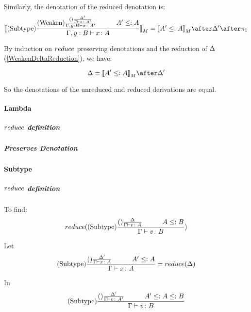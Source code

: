 {            Similarly, the denotation of the reduced denotation is:
            \begin{equation}
                \deno{\treerule{Subtype}{
                    \treerule{Weaken}{
                        \treerule{}{\D'}{\gtyperelation{x}{A'}}
                    } {
                        \typerelation{\gby}{x}{A'}
                    }
                    \s\s
                    A' \subtype A
                    }{\typerelation{\gby}{x}{A}}} = \deno{A'\subtype A}\after \D' \after \p
            \end{equation}


            By induction on $reduce$ preserving denotations and the reduction of $\Delta$ (\ref{WeakenDeltaReduction}), we have:

            \begin{equation}
                \D = \deno{A' \subtype A}\after\D'
            \end{equation}

            So the denotations of the unreduced and reduced derivations are equal.

            \paragraph{Lambda}
            \subparagraph{$reduce$ definition}
            \subparagraph{Preserves Denotation}

            \paragraph{Subtype}
            \subparagraph{$reduce$ definition}
            To find:
            \begin{equation}
                \reduce(\treerule{Subtype}{\treerule{}{\D}{\gtyperelation{v}{A}}\s\s A \subtype B}{\gtyperelation{v}{B}})
            \end{equation}

            Let 
            \begin{equation}\label{SubtypeDeltaReduction}
                \treerule{Subtype}{\treerule{}{\D'}{\gtyperelation{x}{A}}\s\s A'\subtype A}{\gtyperelation{x}{A}} = \reduce(\D)
            \end{equation}

            In 
            \begin{equation}
                \treerule{Subtype}{
                    \treerule{}{\D'}{\gtyperelation{v}{A'}}
                \s\s
                A' \subtype A \subtype B
                }{\gtyperelation{v}{B}}
            \end{equation}

}
